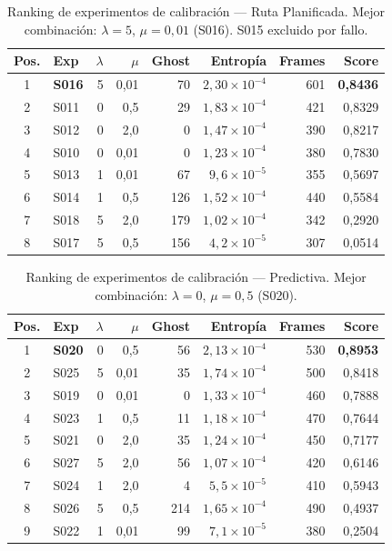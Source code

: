 \begin{table}[htbp]
    \centering
    \caption{Ranking de experimentos de calibración --- Ruta Planificada. Mejor combinación: $\lambda=5$, $\mu=0{,}01$ (S016). S015 excluido por fallo.}%
    \label{tab:cal_rank_e2}
    \begin{tabular}{clrrrrrr}
        \toprule
        \textbf{Pos.} & \textbf{Exp} & $\lambda$ & $\mu$ & \textbf{Ghost} & \textbf{Entropía} & \textbf{Frames} & \textbf{Score} \\
        \midrule
        1 & \textbf{S016} & 5 & 0,01 &  70 & $2{,}30\times10^{-4}$ & 601 & \textbf{0,8436} \\
        2 & S011 & 0 & 0,5  &  29 & $1{,}83\times10^{-4}$ & 421 & 0,8329 \\
        3 & S012 & 0 & 2,0  &   0 & $1{,}47\times10^{-4}$ & 390 & 0,8217 \\
        4 & S010 & 0 & 0,01 &   0 & $1{,}23\times10^{-4}$ & 380 & 0,7830 \\
        5 & S013 & 1 & 0,01 &  67 & $9{,}6\times10^{-5}$  & 355 & 0,5697 \\
        6 & S014 & 1 & 0,5  & 126 & $1{,}52\times10^{-4}$ & 440 & 0,5584 \\
        7 & S018 & 5 & 2,0  & 179 & $1{,}02\times10^{-4}$ & 342 & 0,2920 \\
        8 & S017 & 5 & 0,5  & 156 & $4{,}2\times10^{-5}$  & 307 & 0,0514 \\
        \bottomrule
    \end{tabular}
\end{table}

\begin{table}[htbp]
    \centering
    \caption{Ranking de experimentos de calibración --- Predictiva. Mejor combinación: $\lambda=0$, $\mu=0{,}5$ (S020).}%
    \label{tab:cal_rank_e3}
    \begin{tabular}{clrrrrrr}
        \toprule
        \textbf{Pos.} & \textbf{Exp} & $\lambda$ & $\mu$ & \textbf{Ghost} & \textbf{Entropía} & \textbf{Frames} & \textbf{Score} \\
        \midrule
        1 & \textbf{S020} & 0 & 0,5  &  56 & $2{,}13\times10^{-4}$ & 530 & \textbf{0,8953} \\
        2 & S025 & 5 & 0,01 &  35 & $1{,}74\times10^{-4}$ & 500 & 0,8418 \\
        3 & S019 & 0 & 0,01 &   0 & $1{,}33\times10^{-4}$ & 460 & 0,7888 \\
        4 & S023 & 1 & 0,5  &  11 & $1{,}18\times10^{-4}$ & 470 & 0,7644 \\
        5 & S021 & 0 & 2,0  &  35 & $1{,}24\times10^{-4}$ & 450 & 0,7177 \\
        6 & S027 & 5 & 2,0  &  56 & $1{,}07\times10^{-4}$ & 420 & 0,6146 \\
        7 & S024 & 1 & 2,0  &   4 & $5{,}5\times10^{-5}$  & 410 & 0,5943 \\
        8 & S026 & 5 & 0,5  & 214 & $1{,}65\times10^{-4}$ & 490 & 0,4937 \\
        9 & S022 & 1 & 0,01 &  99 & $7{,}1\times10^{-5}$  & 380 & 0,2504 \\
        \bottomrule
    \end{tabular}
\end{table}

